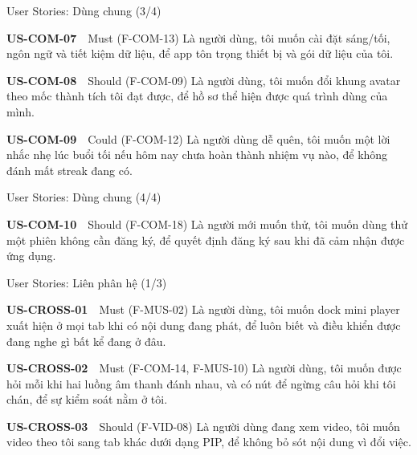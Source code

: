 \begin{frame}{User Stories: Dùng chung (3/4)}
\linespread{0.85}
\begin{block}{\scriptsize\bfseries US-COM-07}~~Must \tiny(F-COM-13)
{\scriptsize Là người dùng, tôi muốn cài đặt sáng/tối, ngôn ngữ và tiết kiệm dữ liệu, để app tôn trọng thiết bị và gói dữ liệu của tôi.}
\end{block}
\vspace{1pt}
\begin{block}{\scriptsize\bfseries US-COM-08}~~Should \tiny(F-COM-09)
{\scriptsize Là người dùng, tôi muốn đổi khung avatar theo mốc thành tích tôi đạt được, để hồ sơ thể hiện được quá trình dùng của mình.}
\end{block}
\vspace{1pt}
\begin{block}{\scriptsize\bfseries US-COM-09}~~Could \tiny(F-COM-12)
{\scriptsize Là người dùng dễ quên, tôi muốn một lời nhắc nhẹ lúc buổi tối nếu hôm nay chưa hoàn thành nhiệm vụ nào, để không đánh mất streak đang có.}
\end{block}
\vspace{1pt}
\end{frame}

\begin{frame}{User Stories: Dùng chung (4/4)}
\linespread{0.85}
\begin{block}{\scriptsize\bfseries US-COM-10}~~Should \tiny(F-COM-18)
{\scriptsize Là người mới muốn thử, tôi muốn dùng thử một phiên không cần đăng ký, để quyết định đăng ký sau khi đã cảm nhận được ứng dụng.}
\end{block}
\vspace{1pt}
\end{frame}

\begin{frame}{User Stories: Liên phân hệ (1/3)}
\linespread{0.85}
\begin{block}{\scriptsize\bfseries US-CROSS-01}~~Must \tiny(F-MUS-02)
{\scriptsize Là người dùng, tôi muốn dock mini player xuất hiện ở mọi tab khi có nội dung đang phát, để luôn biết và điều khiển được đang nghe gì bất kể đang ở đâu.}
\end{block}
\vspace{1pt}
\begin{block}{\scriptsize\bfseries US-CROSS-02}~~Must \tiny(F-COM-14, F-MUS-10)
{\scriptsize Là người dùng, tôi muốn được hỏi mỗi khi hai luồng âm thanh đánh nhau, và có nút để ngừng câu hỏi khi tôi chán, để sự kiểm soát nằm ở tôi.}
\end{block}
\vspace{1pt}
\begin{block}{\scriptsize\bfseries US-CROSS-03}~~Should \tiny(F-VID-08)
{\scriptsize Là người dùng đang xem video, tôi muốn video theo tôi sang tab khác dưới dạng PIP, để không bỏ sót nội dung vì đổi việc.}
\end{block}
\vspace{1pt}
\end{frame}

